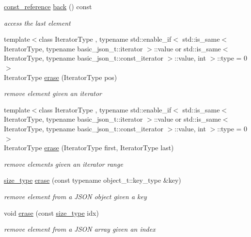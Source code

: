 \begin{DoxyCompactItemize}
\mbox{\hyperlink{classnlohmann_1_1basic__json_a4057c5425f4faacfe39a8046871786ca}{const\+\_\+reference}} \mbox{\hyperlink{classnlohmann_1_1basic__json_a83fe4a151b3a591f357527d5d9aa1b9f}{back}} () const
\begin{DoxyCompactList}\small\item\em access the last element \end{DoxyCompactList}\item 
{\footnotesize template$<$class Iterator\+Type , typename std\+::enable\+\_\+if$<$ std\+::is\+\_\+same$<$ Iterator\+Type, typename basic\+\_\+json\+\_\+t\+::iterator $>$\+::value or std\+::is\+\_\+same$<$ Iterator\+Type, typename basic\+\_\+json\+\_\+t\+::const\+\_\+iterator $>$\+::value, int $>$\+::type  = 0$>$ }\\Iterator\+Type \mbox{\hyperlink{classnlohmann_1_1basic__json_a068a16e76be178e83da6a192916923ed}{erase}} (Iterator\+Type pos)
\begin{DoxyCompactList}\small\item\em remove element given an iterator \end{DoxyCompactList}\item 
{\footnotesize template$<$class Iterator\+Type , typename std\+::enable\+\_\+if$<$ std\+::is\+\_\+same$<$ Iterator\+Type, typename basic\+\_\+json\+\_\+t\+::iterator $>$\+::value or std\+::is\+\_\+same$<$ Iterator\+Type, typename basic\+\_\+json\+\_\+t\+::const\+\_\+iterator $>$\+::value, int $>$\+::type  = 0$>$ }\\Iterator\+Type \mbox{\hyperlink{classnlohmann_1_1basic__json_a4b3f7eb2d4625d95a51fbbdceb7c5f39}{erase}} (Iterator\+Type first, Iterator\+Type last)
\begin{DoxyCompactList}\small\item\em remove elements given an iterator range \end{DoxyCompactList}\item 
\mbox{\hyperlink{classnlohmann_1_1basic__json_a39f2cd0b58106097e0e67bf185cc519b}{size\+\_\+type}} \mbox{\hyperlink{classnlohmann_1_1basic__json_a2f8484d69c55d8f2a9697a7bec29362a}{erase}} (const typename object\+\_\+t\+::key\+\_\+type \&key)
\begin{DoxyCompactList}\small\item\em remove element from a J\+S\+ON object given a key \end{DoxyCompactList}\item 
void \mbox{\hyperlink{classnlohmann_1_1basic__json_a88cbcefe9a3f4d294bed0653550a5cb9}{erase}} (const \mbox{\hyperlink{classnlohmann_1_1basic__json_a39f2cd0b58106097e0e67bf185cc519b}{size\+\_\+type}} idx)
\begin{DoxyCompactList}\small\item\em remove element from a J\+S\+ON array given an index \end{DoxyCompactList}\end{DoxyCompactItemize}
